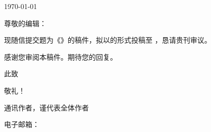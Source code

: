 \documentclass[11pt]{article}
\begin{document}
\hfill\today\par
\EditorName\par
\EditorTitle\par
\textit{\JournalName}

尊敬的编辑：

现随信提交题为《\ManuscriptTitle》的稿件，拟以\ArticleType 的形式投稿至
\textit{\JournalName}，恳请贵刊审议。


感谢您审阅本稿件。期待您的回复。

此致\par
敬礼！\par
\vspace{0.22in}

\begingroup
\setlength{\parskip}{2pt}
{\bfseries\CorrespondenceAuthorNameZh}\par
通讯作者，谨代表全体作者\par
\CorrespondenceAuthorAffiliationZh\par
\CorrespondenceAuthorAddress\par
电子邮箱：\href{mailto:\CorrespondenceAuthorEmail}{\CorrespondenceAuthorEmail}
\endgroup
\end{document}
